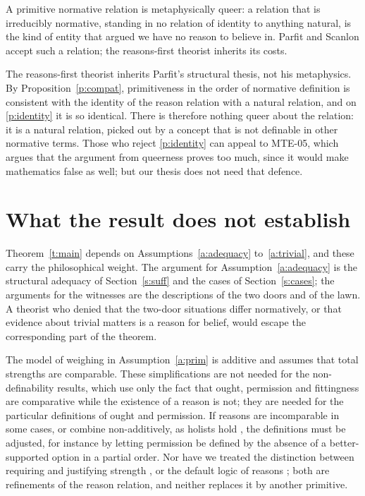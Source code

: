 \documentclass{situationist-preprint}
\begin{document}
\begin{objection}[Queerness]\label{o:queer}
A primitive normative relation is metaphysically queer: a relation that is irreducibly normative, standing in no relation of identity to anything natural, is the kind of entity that \citet{Mackie1977} argued we have no reason to believe in. Parfit and Scanlon accept such a relation; the reasons-first theorist inherits its costs.
\end{objection}

\begin{reply}
The reasons-first theorist inherits Parfit's structural thesis, not his metaphysics. By Proposition~\ref{p:compat}, primitiveness in the order of normative definition is consistent with the identity of the reason relation with a natural relation, and on \ref{p:identity} it is so identical. There is therefore nothing queer about the relation: it is a natural relation, picked out by a concept that is not definable in other normative terms. Those who reject \ref{p:identity} can appeal to MTE-05, which argues that the argument from queerness proves too much, since it would make mathematics false as well; but our thesis does not need that defence.
\end{reply}

\section{What the result does not establish}\label{s:limits}

Theorem~\ref{t:main} depends on Assumptions~\ref{a:adequacy} to~\ref{a:trivial}, and these carry the philosophical weight. The argument for Assumption~\ref{a:adequacy} is the structural adequacy of Section~\ref{s:suff} and the cases of Section~\ref{s:cases}; the arguments for the witnesses are the descriptions of the two doors and of the lawn. A theorist who denied that the two-door situations differ normatively, or that evidence about trivial matters is a reason for belief, would escape the corresponding part of the theorem.

The model of weighing in Assumption~\ref{a:prim} is additive and assumes that total strengths are comparable. These simplifications are not needed for the non-definability results, which use only the fact that ought, permission and fittingness are comparative while the existence of a reason is not; they are needed for the particular definitions of ought and permission. If reasons are incomparable in some cases, or combine non-additively, as holists hold \citep{Dancy2004}, the definitions must be adjusted, for instance by letting permission be defined by the absence of a better-supported option in a partial order. Nor have we treated the distinction between requiring and justifying strength \citep{Gert2004}, or the default logic of reasons \citep{Horty2012}; both are refinements of the reason relation, and neither replaces it by another primitive.
\end{document}
